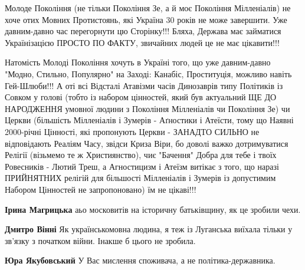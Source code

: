 \begin{itemize}
\begin{itemize}
Молоде Покоління (не тільки Покоління Зе, а й моє Покоління Мілленіалів) не
хоче отих Мовних Протистоянь, які Україна 30 років не може завершити. Уже
давним-давно час перегорнути цю Сторінку!!! Бляха, Держава має займатися
Українізацією ПРОСТО ПО ФАКТУ, звичайних людей це не має цікавити!!! 

Натомість Молоді Покоління хочуть в Україні того, що уже давним-давно "Модно,
Стильно, Популярно" на Заході: Канабіс, Проституція, можливо навіть
Гей-Шлюби!!! А оті всі Відсталі Атавізми часів Динозаврів типу Політиків із
Совком у голові (тобто із набором цінностей, який був актуальний ЩЕ ДО
НАРОДЖЕННЯ умовної людини з Покоління Мілленіалів чи Покоління Зе) чи Церкви
(більшість Мілленіалів і Зумерів - Аґностики і Атеїсти, тому що Наявні
2000-річні Цінності, які пропонують Церкви - ЗАНАДТО СИЛЬНО не відповідають
Реаліям Часу, звідси Криза Віри, бо доволі важко дотримуватися Релігії
(візьмемо те ж Християнство), чиє "Бачення" Добра для тебе і твоїх Ровесників -
Лютий Треш, а Агностицизм і Атеїзм витікає з того, що наразі ПРИЙНЯТНИХ релігій
для більшості Мілленіалів і Зумерів із допустимим Набором Цінностей не
запропоновано) їм не цікаві!!!

 
\textbf{Ірина Магрицька} аьо московитів на історичну батьківщину, як це зробили чехи.

 
\textbf{Дмитро Вінні} Як українськомовна людина, я теж із Луганська виїхала тільки у зв'язку з початком війни. Інакше б цього не зробила.

 
\textbf{Юра Якубовський} У Вас мислення споживача, а не політика-державника.

 

\end{itemize}
\end{itemize}
